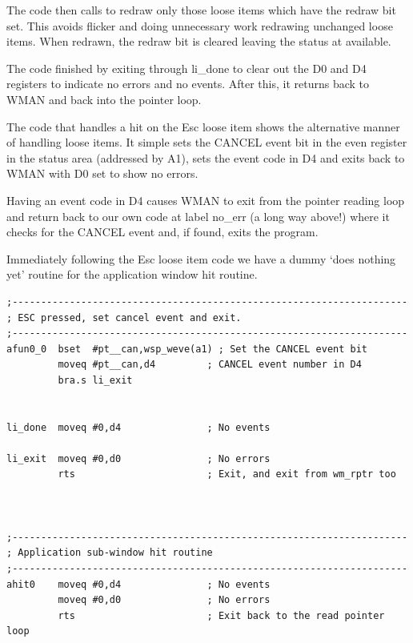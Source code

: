 The code then calls  to redraw only
    those loose items which have the redraw bit set. This avoids flicker and
    doing unnecessary work redrawing unchanged loose items. When redrawn, the
    redraw bit is cleared leaving the status at available.

The code finished by exiting through li\_done to
    clear out the D0 and D4 registers to indicate no errors and no events.
    After this, it returns back to WMAN and back
    into the pointer loop.

The code that handles a hit on the Esc loose item shows the
    alternative manner of handling loose items. It simple sets the CANCEL
    event bit in the even register in the status area (addressed by A1), sets
    the event code in D4 and exits back to WMAN with D0 set to show no
    errors.

Having an event code in D4 causes WMAN to exit from the pointer
    reading loop and return back to our own code at label
 no\_err (a long way above!) where it checks for the
    CANCEL event and, if found, exits the program.

Immediately following the Esc loose item code we have a dummy
    `does nothing yet' routine for the application window hit routine.

\begin{lstlisting}[firstnumber=last,caption={LibGen\_asm - ESC Action \& Dummy Application Window Hit Routine}]
;---------------------------------------------------------------------
; ESC pressed, set cancel event and exit.
;---------------------------------------------------------------------
afun0_0  bset  #pt__can,wsp_weve(a1) ; Set the CANCEL event bit
         moveq #pt__can,d4         ; CANCEL event number in D4
         bra.s li_exit


li_done  moveq #0,d4               ; No events

li_exit  moveq #0,d0               ; No errors
         rts                       ; Exit, and exit from wm_rptr too



;---------------------------------------------------------------------
; Application sub-window hit routine
;---------------------------------------------------------------------
ahit0    moveq #0,d4               ; No events
         moveq #0,d0               ; No errors
         rts                       ; Exit back to the read pointer loop
\end{lstlisting}

